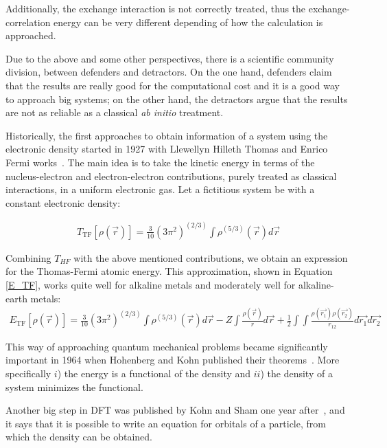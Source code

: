 Additionally, the exchange interaction is not correctly treated,
thus the exchange-correlation energy can be very different depending of how the
calculation is approached.

Due to the above and some other perspectives, there is a scientific community
division, between defenders and detractors. On the one hand, defenders claim
that the results are really good for the computational cost and it is a good
way to approach big systems; on the other hand, the detractors argue that the
results are not as reliable as a classical \textit{ab initio} treatment.

Historically, the first approaches to obtain information of a system using the
electronic density started in 1927 with Llewellyn Hilleth Thomas and Enrico
Fermi works~\cite{Thomas1927,fermi1927statistical}. The main idea is to take
the kinetic energy in terms of the nucleus-electron and
electron-electron contributions, purely treated as classical interactions, in a
uniform electronic gas. Let a fictitious system be with a constant electronic
density:

\begin{align}
{T}_{\mathrm{TF}}[\rho(\vec{r})]=\displaystyle\frac{3}{10}(3\pi^2)^{(2/3)}\int
\rho^{(5/3)}(\vec{r})d\vec{r}
\end{align}

Combining $T_{HF}$ with the above mentioned contributions, we obtain an
expression for the Thomas-Fermi atomic energy. This approximation, shown in
Equation \ref{E_TF}, works quite well for alkaline metals and moderately
well for alkaline-earth metals:
%
\begin{align}
{E}_{\mathrm{TF}}[\rho(\vec{r})]=\displaystyle\frac{3}{10}(3\pi^2)^{(2/3)}\int
\rho^{(5/3)}(\vec{r})d\vec{r}-Z\int\displaystyle\frac{\rho(\vec{r})}{r}d\vec{r}
+
\displaystyle\frac{1}{2}\int\int\displaystyle\frac{\rho(\vec{r_1})\rho(\vec{r_2})}{r_{12}}
d\vec{r_1}d\vec{r_2}
\label{E_TF}
\end{align}

This way of approaching quantum mechanical problems became significantly
important in 1964 when Hohenberg and Kohn published their
theorems~\cite{Hohenberg1964}. More specifically $i$) the energy is a
functional of the density and $ii$) the density of a system minimizes the
functional.

Another big step in DFT was published by Kohn and Sham one year
after~\cite{Kohn1965}, and it says that it is possible to write an equation for
orbitals of a particle, from which the density can be obtained.

